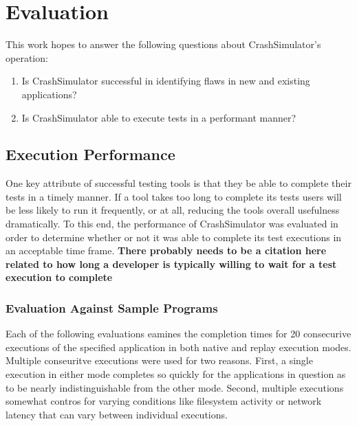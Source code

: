 \section{Evaluation}

    This work hopes to answer the following questions about CrashSimulator's operation:

        \begin{enumerate}
            \item{Is CrashSimulator successful in identifying flaws in new and existing applications?}
            \item{Is CrashSimulator able to execute tests in a performant manner?}
        \end{enumerate}

    \subsection{Execution Performance}

        One key attribute of successful testing tools is that they be able to complete their tests in a timely manner.
        If a tool takes too long to complete its tests users will be less likely to run it frequently, or at all,
        reducing the tools overall usefulness dramatically. To this end, the performance of CrashSimulator was evaluated
        in order to determine whether or not it was able to complete its test executions in an acceptable time frame.
        \textbf{There probably needs to be a citation here related to how long a developer is typically willing to wait
        for a test execution to complete}

        \subsubsection{Evaluation Against Sample Programs}

        Each of the following evaluations eamines the completion times for 20 consecurive executions of the specified
        application in both native and replay execution modes.  Multiple conseuritve executions were used for two
        reasons.  First, a single execution in either mode completes so quickly for the applications in question as to
        be nearly indistinguishable from the other mode.  Second, multiple executions somewhat contros for varying
        conditions like filesystem activity or network latency that can vary between individual executions.

